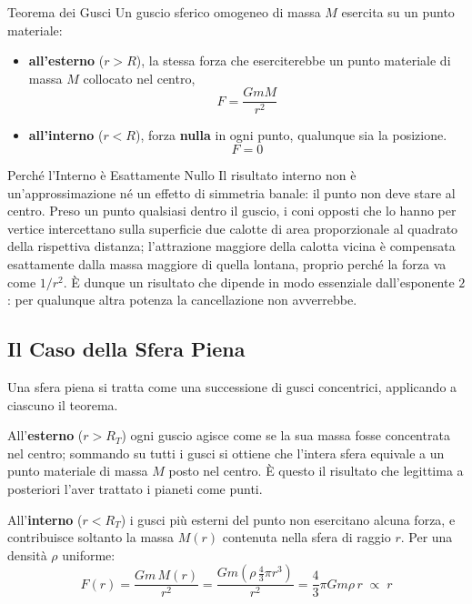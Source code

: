 \begin{teorema}{Teorema dei Gusci}
Un guscio sferico omogeneo di massa $M$ esercita su un punto materiale:
\begin{itemize}[leftmargin=1.4em]
    \item \textbf{all'esterno} ($r > R$), la stessa forza che eserciterebbe un punto materiale di massa $M$ collocato nel centro,
    \begin{equation*}
        F = \frac{GmM}{r^2}
    \end{equation*}
    \item \textbf{all'interno} ($r < R$), forza \textbf{nulla} in ogni punto, qualunque sia la posizione.
    \begin{equation*}
        F = 0
    \end{equation*}
\end{itemize}
\end{teorema}

\begin{osservazione}{Perché l'Interno è Esattamente Nullo}
Il risultato interno non è un'approssimazione né un effetto di simmetria banale: il punto non deve stare al centro. Preso un punto qualsiasi dentro il guscio, i coni opposti che lo hanno per vertice intercettano sulla superficie due calotte di area proporzionale al quadrato della rispettiva distanza; l'attrazione maggiore della calotta vicina è compensata esattamente dalla massa maggiore di quella lontana, proprio perché la forza va come $1/r^2$. È dunque un risultato che dipende in modo essenziale dall'esponente $2$: per qualunque altra potenza la cancellazione non avverrebbe.
\end{osservazione}

\subsection{Il Caso della Sfera Piena}

Una sfera piena si tratta come una successione di gusci concentrici, applicando a ciascuno il teorema.

All'\textbf{esterno} ($r > R_T$) ogni guscio agisce come se la sua massa fosse concentrata nel centro; sommando su tutti i gusci si ottiene che l'intera sfera equivale a un punto materiale di massa $M$ posto nel centro. È questo il risultato che legittima a posteriori l'aver trattato i pianeti come punti.

All'\textbf{interno} ($r < R_T$) i gusci più esterni del punto non esercitano alcuna forza, e contribuisce soltanto la massa $M(r)$ contenuta nella sfera di raggio $r$. Per una densità $\rho$ uniforme:
\begin{equation}
    F(r) = \frac{G m \, M(r)}{r^2}
         = \frac{G m \left(\rho \, \tfrac{4}{3}\pi r^3\right)}{r^2}
         = \frac{4}{3}\pi G m \rho \, r \; \propto \; r
\end{equation}

